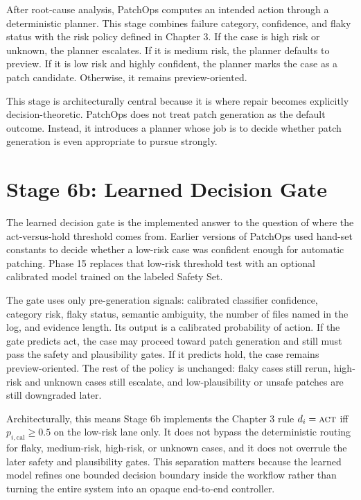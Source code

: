 After root-cause analysis, PatchOps computes an intended action through a deterministic planner. This stage
combines failure category, confidence, and flaky status with the risk policy defined in Chapter 3. If the case
is high risk or unknown, the planner escalates. If it is medium risk, the planner defaults to preview. If it is
low risk and highly confident, the planner marks the case as a patch candidate. Otherwise, it remains
preview-oriented.

This stage is architecturally central because it is where repair becomes explicitly decision-theoretic. PatchOps
does not treat patch generation as the default outcome. Instead, it introduces a planner whose job is to decide
whether patch generation is even appropriate to pursue strongly.

\section{Stage 6b: Learned Decision Gate}

The learned decision gate is the implemented answer to the question of where the act-versus-hold threshold
comes from. Earlier versions of PatchOps used hand-set constants to decide whether a low-risk case was confident
enough for automatic patching. Phase 15 replaces that low-risk threshold test with an optional calibrated model
trained on the labeled Safety Set.

The gate uses only pre-generation signals: calibrated classifier confidence, category risk, flaky status,
semantic ambiguity, the number of files named in the log, and evidence length. Its output is a calibrated
probability of action. If the gate predicts act, the case may proceed toward patch generation and still must
pass the safety and plausibility gates. If it predicts hold, the case remains preview-oriented. The rest of the
policy is unchanged: flaky cases still rerun, high-risk and unknown cases still escalate, and low-plausibility
or unsafe patches are still downgraded later.

Architecturally, this means Stage 6b implements the Chapter 3 rule
\(
d_i = \textsc{act}
\)
iff
\(
p_{i,\mathrm{cal}} \ge 0.5
\)
on the low-risk lane only. It does not bypass the deterministic routing for flaky, medium-risk, high-risk, or
unknown cases, and it does not overrule the later safety and plausibility gates. This separation matters
because the learned model refines one bounded decision boundary inside the workflow rather than turning the
entire system into an opaque end-to-end controller.

